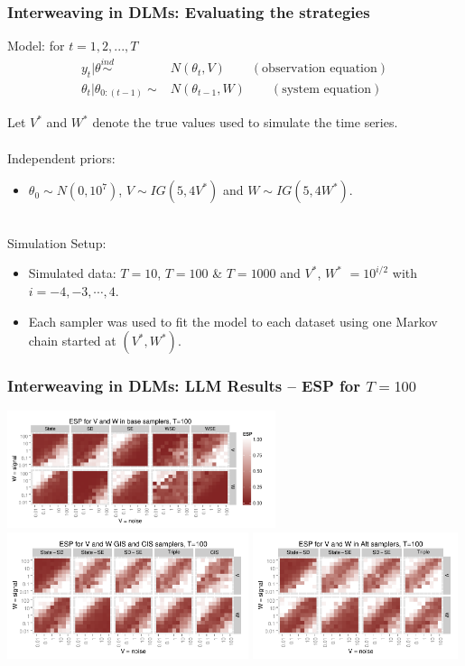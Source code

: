 \documentclass[xcolor=dvipsnames]{beamer}
\begin{document}
\begin{frame}[fragile]
\frametitle{Interweaving in DLMs: Evaluating the strategies}
Model: for $t=1,2,...,T$
\begin{align*}
    y_t|\theta  \stackrel{ind}{\sim}&N(\theta_t,V) \qquad (\mbox{observation equation})\\
    \theta_t|\theta_{0:(t-1)} \sim& N(\theta_{t-1},W) \qquad (\mbox{system equation})
  \end{align*} 

Let $V^*$ and $W^*$ denote the true values used to simulate the time series.\\~\\

Independent priors:
\begin{itemize}
\item $\theta_0\sim N(0, 10^7)$, $V\sim IG(5, 4V^*)$ and $W\sim IG(5, 4W^*)$.\\~\\
\end{itemize}

Simulation Setup:
\begin{itemize}
\item Simulated data: $T=10$, $T=100$ \& $T=1000$ and $V^*$, $W^*$ $=10^{i/2}$ with $i=-4,-3,\cdots,4$.
\item Each sampler was used to fit the model to each dataset using one Markov chain started at $(V^*,W^*)$.
\end{itemize}


\end{frame}

\begin{frame}
\frametitle{Interweaving in DLMs: LLM Results -- ESP for $T=100$}
\centering
\includegraphics[width=0.59\textwidth]{../dlmasis/doc/plots/basecisESplot100}\\
\includegraphics[width=0.53\textwidth]{../dlmasis/doc/plots/altintESplotV100}
\includegraphics[width=0.45\textwidth]{../dlmasis/doc/plots/altintESplotW100}
\end{frame}
\end{document}
